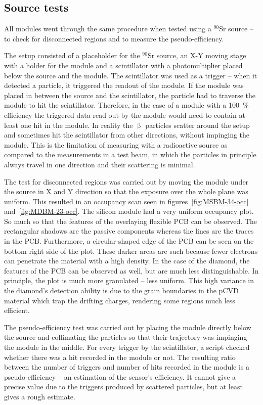 \documentclass[12pt]{packages/mytustyle}  %
\begin{document}
\subsection{Source tests}
All modules went through the same procedure when tested using a $^{90}$Sr source -- to check for disconnected regions and to measure the pseudo-efficiency. 

The setup consisted of a placeholder for the $^{90}$Sr source, an X-Y moving stage with a holder for the module and a scintillator with a photomultiplier placed below the source and the module. The scintillator was used as a trigger -- when it detected a particle, it triggered the readout of the module. If the module was placed in between the source and the scintillator, the particle had to traverse the module to hit the scintillator. Therefore, in the case of a module with a 100~\% efficiency the triggered data read out by the module would need to contain at least one hit in the module. In reality the $\upbeta$ particles scatter around the setup and sometimes hit the scintillator from other directions, without impinging the module. This is the limitation of measuring with a radioactive source as compared to the measurements in a test beam, in which the particles in principle always travel in one direction and their scattering is minimal. 

The test for disconnected regions was carried out by moving the module under the source in X and Y direction so that the exposure over the whole plane was uniform. This resulted in an occupancy scan seen in figures~\ref{fig:MSBM-34-occ} and~\ref{fig:MDBM-23-occ}. The silicon module had a very uniform occupancy plot. So much so that the features of the overlaying flexible PCB can be observed. The rectangular shadows are the passive components whereas the lines are the traces in the PCB. Furthermore, a circular-shaped edge of the PCB can be seen on the bottom right side of the plot. These darker areas are such because fewer electrons can penetrate the material with a high density. In the case of the diamond, the features of the PCB can be observed as well, but are much less distinguishable. In principle, the plot is much more granulated -- less uniform. This high variance in the diamond's detection ability is due to the grain boundaries in the pCVD material which trap the drifting charges, rendering some regions much less efficient. 

The pseudo-efficiency test was carried out by placing the module directly below the source and collimating the particles so that their trajectory was impinging the module in the middle. For every trigger by the scintillator, a script checked whether there was a hit recorded in the module or not. The resulting ratio between the number of triggers and number of hits recorded in the module is a pseudo-efficiency -- an estimation of the sensor's efficiency. It cannot give a precise value due to the triggers produced by scattered particles, but at least gives a rough estimate.
\end{document}
